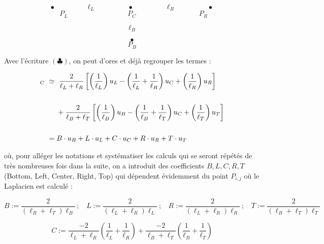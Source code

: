 \documentclass[12pt]{article}
\begin{document}
$$\bullet~~~~~~~~~~~~~~~~~~~~\ell_L~~~~~~~~~~~~~~~~~~~~\bullet~~~~~~~~~~~~~~~~~~~~\ell_R~~~~~~~~~~~~~~~~~~~~\bullet$$
$$~~P_L~~~~~~~~~~~~~~~~~~~~~~~~~~~~~~~~~~~~~~P_C~~~~~~~~~~~~~~~~~~~~~~~~~~~~~~~~~~~~~~~~P_R$$

\vspace{2 mm}

$$\ell_B$$

\vspace{2 mm}

$$\bullet$$
$$P_B$$

\vspace{5 mm}

\noindent
Avec l'écriture $(\clubsuit)$, on peut d'ores et déjà regrouper les termes :

\begin{align*}
[\Delta u]_C~ &\simeq~ \frac{2}{\ell_L + \ell_R} \left[ \left( \frac{1}{\ell_L} \right) u_L - \left( \frac{1}{\ell_L} + \frac{1}{\ell_R}  \right) u_C + \left( \frac{1}{\ell_R} \right) u_R  \right] \\
& \vspace{5 mm} \\
&~~~~+ \frac{2}{\ell_B + \ell_T} \left[ \left( \frac{1}{\ell_B} \right) u_B - \left( \frac{1}{\ell_B} + \frac{1}{\ell_T} \right) u_C + \left( \frac{1}{\ell_T} \right) u_T \right] \\
& \vspace{5 mm} \\
&= B \cdot u_B + L \cdot u_L + C \cdot u_C + R \cdot u_R + T \cdot u_T
\end{align*}

\vspace{5 mm}

\noindent
où, pour alléger les notations et systématiser les calculs qui se seront répétés de très nombreuses fois dans la suite, on a introduit des coefficients $B,L,C,R,T$ (Bottom, Left, Center, Right, Top) qui dépendent évidemment du point $P_{i,j}$ où le Laplacien est calculé :

$$B := \frac{2}{(\ell_B + \ell_T) \ell_B} ~;~~~~ L := \frac{2}{(\ell_L + \ell_R) \ell_L} ~;~~~~ R := \frac{2}{(\ell_L + \ell_R) \ell_R} ~;~~~~ T := \frac{2}{(\ell_B + \ell_T) \ell_T}$$

$$C := \frac{-2}{\ell_L + \ell_R} \left( \frac{1}{\ell_L} + \frac{1}{\ell_R} \right) + \frac{-2}{\ell_B + \ell_T} \left( \frac{1}{\ell_B} + \frac{1}{\ell_T} \right)$$

\vspace{5 mm}
\end{document}
